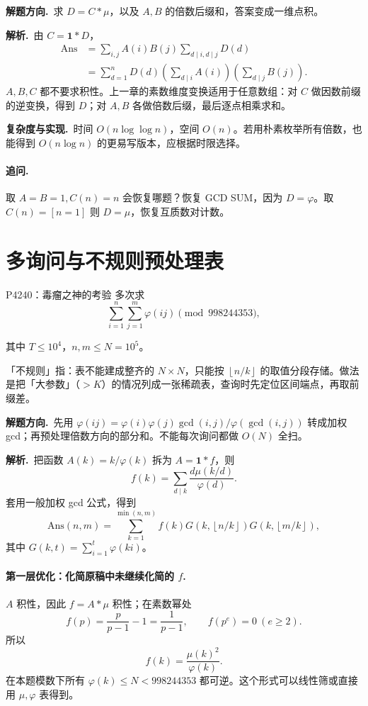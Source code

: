 \documentclass[UTF8,a4paper,11pt,twoside,openright,fontset=fandol]{ctexbook}
\theoremstyle{definition}
\newcommand{\one}{\mathbf 1}
\newcommand{\floor}[1]{\left\lfloor #1\right\rfloor}
\newcommand{\sol}{\par\noindent\textbf{解析.}\ }
\newcommand{\hint}{\par\noindent\textbf{解题方向.}\ }
\newcommand{\cost}{\par\noindent\textbf{复杂度与实现.}\ }
\begin{document}
\hint 求 $D=C*\mu$，以及 $A,B$ 的倍数后缀和，答案变成一维点积。

\sol 由 $C=\one*D$，
\[
\begin{aligned}
\mathrm{Ans}
&=\sum_{i,j}A(i)B(j)\sum_{d\mid i,d\mid j}D(d)\\
&=\sum_{d=1}^nD(d)
 \left(\sum_{d\mid i}A(i)\right)
 \left(\sum_{d\mid j}B(j)\right).
\end{aligned}
\]
$A,B,C$ 都不要求积性。上一章的素数维度变换适用于任意数组：对 $C$ 做因数前缀的逆变换，得到 $D$；对 $A,B$ 各做倍数后缀，最后逐点相乘求和。
\cost 时间 $O(n\log\log n)$，空间 $O(n)$。若用朴素枚举所有倍数，也能得到 $O(n\log n)$ 的更易写版本，应根据时限选择。
\paragraph{追问.} 取 $A=B=1,C(n)=n$ 会恢复哪题？恢复 GCD SUM，因为 $D=\varphi$。取 $C(n)=[n=1]$ 则 $D=\mu$，恢复互质数对计数。


\section{多询问与不规则预处理表}
\begin{problem}{P4240：毒瘤之神的考验}
多次求
\[
 \sum_{i=1}^n\sum_{j=1}^m\varphi(ij)\pmod{998244353},
\]


其中 $T\le10^4$，$n,m\le N=10^5$。
\end{problem}

\begin{tip}[词义：不规则的预处理表]
「不规则」指：表不能建成整齐的 $N\times N$，只能按 $\floor{n/k}$ 的取值分段存储。做法是把「大参数」（$>K$）的情况列成一张稀疏表，查询时先定位区间端点，再取前缀差。
\end{tip}

\hint 先用 $\varphi(ij)=\varphi(i)\varphi(j)\gcd(i,j)/\varphi(\gcd(i,j))$ 转成加权 gcd；再预处理倍数方向的部分和。不能每次询问都做 $O(N)$ 全扫。

\sol 把函数 $A(k)=k/\varphi(k)$ 拆为 $A=\one*f$，则
\[
 f(k)=\sum_{d\mid k}\frac{d\mu(k/d)}{\varphi(d)}.
\]
套用一般加权 gcd 公式，得到
\[
\boxed{\mathrm{Ans}(n,m)=\sum_{k=1}^{\min(n,m)}f(k)
G\left(k,\floor{n/k}\right)G\left(k,\floor{m/k}\right)},
\]
其中 $G(k,t)=\sum_{i=1}^t\varphi(ki)$。

\paragraph{第一层优化：化简原稿中未继续化简的 $f$.}
$A$ 积性，因此 $f=A*\mu$ 积性；在素数幂处
\[
 f(p)=\frac p{p-1}-1=\frac1{p-1},\qquad
 f(p^e)=0\ (e\ge2).
\]
所以
\[
 f(k)=\frac{\mu(k)^2}{\varphi(k)}.
\]
在本题模数下所有 $\varphi(k)\le N<998244353$ 都可逆。这个形式可以线性筛或直接用 $\mu,\varphi$ 表得到。
\end{document}
